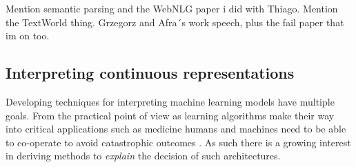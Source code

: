 Mention semantic parsing and the WebNLG paper i did with Thiago. Mention the TextWorld thing. Grzegorz and Afra´s work speech, plus the fail paper that im on too.


\subsection{Interpreting continuous representations}
Developing techniques for interpreting machine learning models have multiple goals. From the practical point of view as learning algorithms
make their way into critical applications such as medicine humans and machines need to be able to co-operate to avoid catastrophic outcomes \cite{caruana2015intelligible}.
As such there is a growing interest in deriving methods to \emph{explain} the decision of such architectures.

